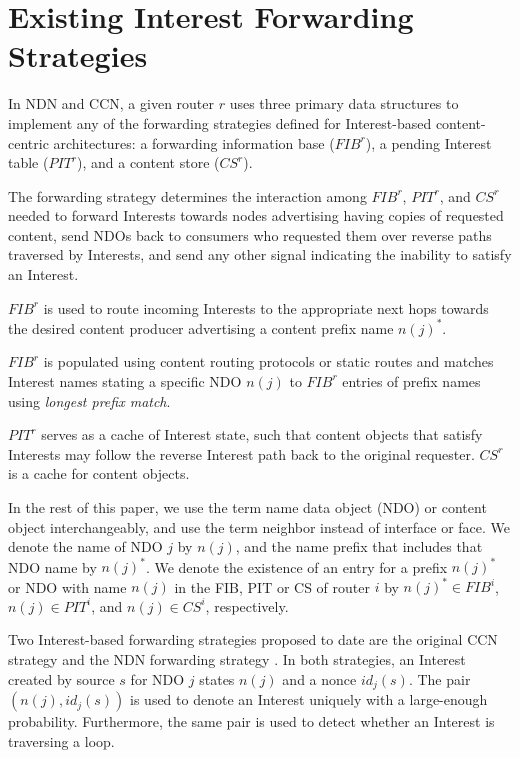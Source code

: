 \documentclass{ancs15-alternate}
\begin{document}
\section{Existing Interest Forwarding \\ Strategies }
\label{sec-prev}

In NDN and CCN, a given router $r$ uses three primary data structures to implement any of the forwarding strategies defined for  Interest-based content-centric architectures: a forwarding information base ($FIB^r$),  a pending Interest table ($PIT^r$), and a content store ($CS^r$). 

The forwarding strategy determines the  interaction among $FIB^r$, $PIT^r$, and $CS^r$ needed to forward Interests towards nodes advertising having copies of requested content, send NDOs back to consumers who requested them over reverse paths traversed by Interests, and send any other signal indicating the inability to satisfy an Interest. 

$FIB^r$ is used to route incoming Interests to the appropriate next hops towards the desired content producer advertising a content prefix name $n(j)^*$. 

$FIB^r$ is populated using content routing protocols or static routes and matches Interest names stating a specific NDO $n(j)$  to $FIB^r$ entries of prefix names using \emph{longest prefix match}. 

$PIT^r$ serves as a cache of Interest state, such that content objects that satisfy Interests may follow the reverse Interest path back to the original requester. 
$CS^r$ is a cache for content objects.

In the rest of this paper, we use the term name data object (NDO) or content object interchangeably, and  use the term neighbor instead of interface or face.
We denote the name of NDO $j$ by $n(j)$, and the name prefix that includes that NDO name by $n(j)^*$.
We denote the existence of  an entry for a prefix $n(j)^*$ or NDO with name $n(j)$ in the FIB, PIT or CS of router $i$ by $n(j)^* \in FIB^i$, $n(j) \in PIT^i$, and $n(j) \in CS^i$, respectively.


Two Interest-based forwarding strategies proposed to date  are the original CCN strategy \cite{ccn} and the  NDN forwarding strategy \cite{ndn-fw, ndn-paper}. In both strategies,  an Interest created by source $s$ for NDO $j$ states  $n(j)$ and a nonce $id_j(s)$. The pair  $(n(j), id_j(s) )$ is used to denote an Interest uniquely with a large-enough probability. Furthermore, the same pair is used to detect whether an Interest is traversing a loop. 
\end{document}
